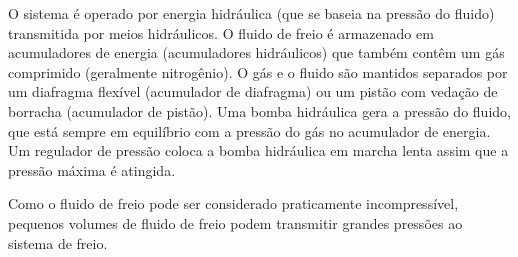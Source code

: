 O sistema é operado por energia hidráulica (que se baseia na pressão do fluido) transmitida por meios hidráulicos. O fluido de freio é armazenado em acumuladores de energia (acumuladores hidráulicos) que também contêm um gás comprimido (geralmente nitrogênio). O gás e o fluido são mantidos separados por um diafragma flexível (acumulador de diafragma) ou um pistão com vedação de borracha (acumulador de pistão). Uma bomba hidráulica gera a pressão do fluido, que está sempre em equilíbrio com a pressão do gás no acumulador de energia. Um regulador de pressão coloca a bomba hidráulica em marcha lenta assim que a pressão máxima é atingida.

Como o fluido de freio pode ser considerado praticamente incompressível, pequenos volumes de fluido de freio podem transmitir grandes pressões ao sistema de freio.

